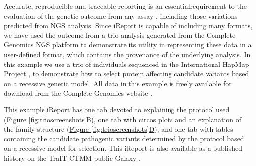 Accurate, reproducible and traceable reporting is an essentialrequirement to the evaluation of the genetic outcome from any assay \cite{skyline}, including those variations predicted from NGS analysis. Since iReport is capable of including many formats, we have used the outcome from a trio analysis generated from the Complete Genomics \cite{drmanac} NGS platform to demonstrate its utility in representing these data in a user-defined format, which contains the provenance of the underlying analysis. In this example we use a trio of individuals sequenced in the International HapMap Project \cite{hapmap}\cite{hapmap2}, to demonstrate how to select protein affecting candidate variants based on a recessive genetic model.  All data in this example is freely available for download from the Complete Genomics website \cite{url-CGpublicdata}.

This example iReport has one tab devoted to explaining the protocol used (\hyperref[fig:trioscreenshots]{Figure \ref*{fig:trioscreenshots}B}), one tab with circos plots and an explanation of the family structure (\hyperref[fig:trioscreenshots]{Figure \ref*{fig:trioscreenshots}D}), and one tab with tables containing the candidate pathogenic variants determined by the protocol based on a recessive model for selection. This iReport is also available as a published history on the TraIT-CTMM public Galaxy \cite{url-traitgalaxy}.

